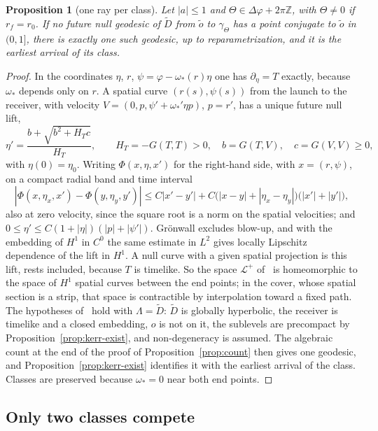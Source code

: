 \documentclass[aip,jmp,amsmath,amssymb,reprint]{revtex4-2}
\theoremstyle{plain}
\newtheorem{proposition}{Proposition}[section]
\theoremstyle{definition}
\begin{document}
\begin{proposition}[one ray per class]\label{prop:kerr-class}
Let $|a|\le1$ and $\Theta\in\Delta\varphi+2\pi\mathbb Z$, with $\Theta\ne0$ if $r_f=r_0$. If no future null geodesic of $\tilde D$ from $\tilde o$ to $\gamma_\Theta$
has a point conjugate to $\tilde o$ in $(0,1]$, there is exactly one such geodesic, up to
reparametrization, and it is the earliest arrival of its class.
\end{proposition}

\begin{proof}
In the coordinates $\eta$, $r$, $\psi=\varphi-\omega_*(r)\eta$ one has $\partial_\eta=T$ exactly, because $\omega_*$ depends only
on $r$. A spatial curve $(r(s),\psi(s))$ from the launch to the receiver, with velocity
$V=(0,p,\psi'+\omega_*'\eta p)$, $p=r'$, has a unique future null lift,
\[
  \eta'=\frac{b+\sqrt{b^2+H_Tc}}{H_T},\qquad H_T=-G(T,T)>0,\quad b=G(T,V),\quad c=G(V,V)\ge0,
\]
with $\eta(0)=\eta_0$. Writing $\Phi(x,\eta,x')$ for the right-hand side, with $x=(r,\psi)$, on a compact radial band
and time interval
\[
  |\Phi(x,\eta_x,x')-\Phi(y,\eta_y,y')|\le C|x'-y'|+C\big(|x-y|+|\eta_x-\eta_y|\big)\big(|x'|+|y'|\big),
\]
also at zero velocity, since the square root is a norm on the spatial velocities; and
$0\le\eta'\le C(1+|\eta|)(|p|+|\psi'|)$. Gr\"onwall excludes blow-up, and with the embedding of $H^1$ in $C^0$ the
same estimate in $L^2$ gives locally Lipschitz dependence of the lift in $H^1$. A null curve with a given spatial projection is this
lift, rests included, because $T$ is timelike. So the space $\mathcal L^+$ of~\cite[(1.4)]{GiannoniMasielloPiccioneMorse}
is homeomorphic to the space of $H^1$ spatial curves between the end points; in the cover, whose
spatial section is a strip, that space is contractible by interpolation toward a fixed path. The
hypotheses of~\cite[Theorem~1.7]{GiannoniMasielloPiccioneMorse} hold with $\Lambda=\tilde D$: $\tilde D$ is globally hyperbolic,
the receiver is timelike and a closed embedding, $o$ is not on it, the sublevels are precompact by
Proposition~\ref{prop:kerr-exist}, and non-degeneracy is assumed. The algebraic count at the end of
the proof of Proposition~\ref{prop:count} then gives one geodesic, and Proposition~\ref{prop:kerr-exist}
identifies it with the earliest arrival of the class. Classes are preserved because $\omega_*=0$ near
both end points.
\end{proof}

\subsection{Only two classes compete}
\end{document}
